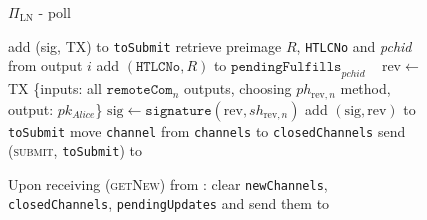 \begin{figure}[H]
\begin{protocolbox}{$\Pi_{\mathrm{LN}}$ - poll}
\begin{algorithmic}[1]
                  \State add (sig, TX) to \texttt{toSubmit}
                \EndIf
              \EndFor
                \State retrieve preimage $R$, \texttt{HTLCNo} and \textit{pchid}
                from output $i$
                \State add $\left(\mathtt{HTLCNo}, R\right)$ to
                $\mathtt{pendingFulfills}_{\mathit{pchid}}$
              \EndFor
            \Else \ 
              \State $\mathrm{rev} \gets$ TX \{inputs: all
              $\mathtt{remoteCom}_n$ outputs, choosing $ph_{\mathrm{rev}, n}$
              method, output: $pk_{\mathit{Alice}}$\}
              \State $\mathrm{sig} \gets \mathtt{signature}\left(\mathrm{rev},
              sh_{\mathrm{rev}, n}\right)$
              \State add $\left(\mathrm{sig}, \mathrm{rev}\right)$ to
              \texttt{toSubmit}
            \EndIf
            \State move \texttt{channel} from \texttt{channels} to
            \texttt{closedChannels}
          \EndFor
          \State send (\textsc{submit}, \texttt{toSubmit}) to \ledger
        \EndIndent
        \Statex

        \State Upon receiving (\textsc{getNew}) from \alice:
        \Indent
          \State clear \texttt{newChannels}, \texttt{closedChannels},
          \texttt{pendingUpdates} and send them to \alice
        \EndIndent
      \end{algorithmic}
    \end{protocolbox}
    \caption{}
    \label{alg:protocol:poll}
  \end{figure}

